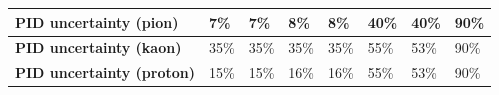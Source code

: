 \begin{table}[hp]
{\begin{tabular}{llllllll}
\multicolumn{1}{|l||}{\textbf{PID uncertainty (pion)}}                  & \multicolumn{1}{l|}{7\%}                                      & \multicolumn{1}{l|}{7\%}                                      & \multicolumn{1}{l|}{8\%}                                      & \multicolumn{1}{l|}{8\%}                                      & \multicolumn{1}{l|}{40\%}                                     & \multicolumn{1}{l|}{40\%}                                     & \multicolumn{1}{l|}{90\%}                                     \\ \hline
\multicolumn{1}{|l||}{\textbf{PID uncertainty (kaon)}}                  & \multicolumn{1}{l|}{35\%}                                     & \multicolumn{1}{l|}{35\%}                                     & \multicolumn{1}{l|}{35\%}                                     & \multicolumn{1}{l|}{35\%}                                     & \multicolumn{1}{l|}{55\%}                                     & \multicolumn{1}{l|}{53\%}                                      & \multicolumn{1}{l|}{90\%}                                     \\ \hline
\multicolumn{1}{|l||}{\textbf{PID uncertainty (proton)}}                & \multicolumn{1}{l|}{15\%}                                     & \multicolumn{1}{l|}{15\%}                                     & \multicolumn{1}{l|}{16\%}                                     & \multicolumn{1}{l|}{16\%}                                     & \multicolumn{1}{l|}{55\%}                                     & \multicolumn{1}{l|}{53\%}                                      & \multicolumn{1}{l|}{90\%}                                     \\ \hline
\end{tabular}}

\end{table}



\pagebreak
\pagebreak
